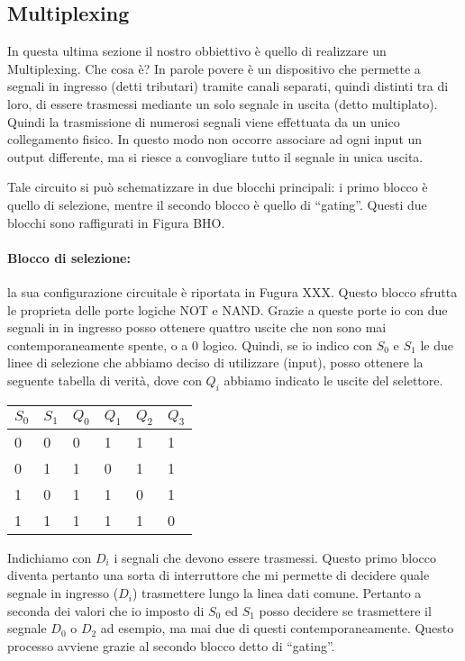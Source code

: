 \subsection*{Multiplexing}

In questa ultima sezione il nostro obbiettivo è quello di realizzare un Multiplexing. Che cosa è? In parole povere è un dispositivo che permette a segnali in ingresso (detti tributari) tramite canali separati, quindi distinti tra di loro, di essere trasmessi mediante un solo segnale in uscita (detto multiplato). Quindi la trasmissione di numerosi segnali viene effettuata da un unico collegamento fisico. In questo modo non occorre associare ad ogni input un output differente, ma si riesce a convogliare tutto il segnale in unica uscita.

Tale circuito si può schematizzare in due blocchi principali: i primo blocco è quello di selezione, mentre il secondo blocco è quello di ``gating''. 
Questi due blocchi sono raffigurati in Figura BHO.

\paragraph*{Blocco di selezione:}
la sua configurazione circuitale è riportata in Fugura XXX. Questo blocco sfrutta le proprieta delle porte logiche NOT e NAND. Grazie a queste porte io con due segnali in in ingresso posso ottenere quattro uscite che non sono mai contemporaneamente spente, o a 0 logico. Quindi, se io indico con $S_0$ e $S_1$ le due linee di selezione che abbiamo deciso di utilizzare (input), posso ottenere la seguente tabella di verità, dove con $Q_i$ abbiamo indicato le uscite del selettore.

\begin{center}
	\begin{tabular}{ll|llll}
	\toprule
		$S_0$ & $S_1$ & $Q_0$ & $Q_1$ & $Q_2$ & $Q_3$ \\
	\midrule
		0 & 0 & 0 & 1 & 1 & 1 \\
		0 & 1 & 1 & 0 & 1 & 1 \\
		1 & 0 & 1 & 1 & 0 & 1 \\
		1 & 1 & 1 & 1 & 1 & 0 \\
	\bottomrule
	\end{tabular}
\end{center}

Indichiamo con $D_i$ i segnali che devono essere trasmessi. Questo primo blocco diventa pertanto una sorta di interruttore che mi permette di decidere quale segnale in ingresso ($D_i$) trasmettere lungo la linea dati comune. Pertanto a seconda dei valori che io imposto di $S_0$ ed $S_1$ posso decidere se trasmettere il segnale $D_0$ o $D_2$ ad esempio, ma mai due di questi contemporaneamente. Questo processo avviene grazie al secondo blocco detto di ``gating''.

